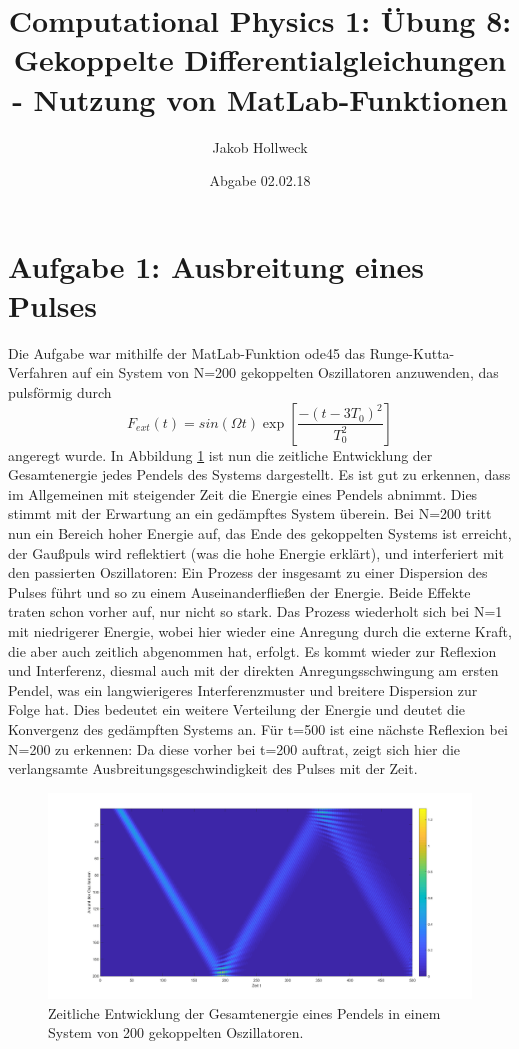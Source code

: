 \documentclass[a4paper, 10pt,onecolumn]{scrartcl}
\title{Computational Physics 1: Übung 8: Gekoppelte Differentialgleichungen - Nutzung von MatLab-Funktionen}
\author{Jakob Hollweck} %
\date{Abgabe 02.02.18}
\begin{document}
\maketitle


\section*{Aufgabe 1: Ausbreitung eines Pulses}

Die Aufgabe war mithilfe der MatLab-Funktion ode45 das Runge-Kutta-Verfahren auf ein System von N=200 gekoppelten Oszillatoren anzuwenden, das pulsförmig durch  \[F_{ext}(t)=sin(\Omega t)\exp\left[
\frac{-(t-3T_0)^2}{T_0^2}
\right]
\] angeregt wurde. 
In Abbildung \ref{Abbildung1} ist nun die zeitliche Entwicklung der Gesamtenergie jedes Pendels des Systems dargestellt. Es ist gut zu erkennen, dass im Allgemeinen mit steigender Zeit die Energie eines Pendels abnimmt. Dies stimmt mit der Erwartung an ein gedämpftes System überein. 
Bei N=200 tritt nun ein Bereich hoher Energie auf, das Ende des gekoppelten Systems ist erreicht, der Gaußpuls wird reflektiert (was die hohe Energie erklärt), und interferiert mit den passierten Oszillatoren: Ein Prozess der insgesamt zu einer Dispersion des Pulses führt und so zu einem Auseinanderfließen der Energie. Beide Effekte traten schon vorher auf, nur nicht so stark. 
Das Prozess wiederholt sich bei N=1 mit niedrigerer Energie, wobei hier wieder eine Anregung durch die externe Kraft, die aber auch zeitlich abgenommen hat, erfolgt. Es kommt wieder zur Reflexion und Interferenz, diesmal auch mit der direkten Anregungsschwingung am ersten Pendel, was ein langwierigeres Interferenzmuster und breitere Dispersion zur Folge hat. Dies bedeutet ein weitere Verteilung der Energie und deutet die Konvergenz des gedämpften Systems an. Für t=500 ist eine nächste Reflexion bei N=200 zu erkennen: Da diese vorher bei t=200 auftrat, zeigt sich hier die verlangsamte Ausbreitungsgeschwindigkeit des Pulses mit der Zeit.

\begin{figure}[ht!]
	\centering
	\includegraphics[scale=0.3,center]{En_Osz.png}
	\caption{Zeitliche Entwicklung der Gesamtenergie eines Pendels in einem System von 200 gekoppelten Oszillatoren.} 
	\label{Abbildung1}
\end{figure}
\end{document}
